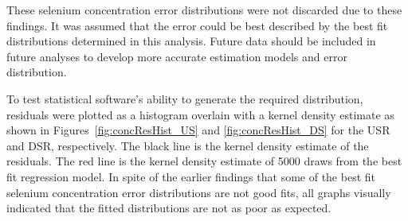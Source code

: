 These selenium concentration error distributions were not discarded due to these findings.  It was assumed that the error could be best described by the best fit distributions determined in this analysis.  Future data should be included in future analyses to develop more accurate estimation models and error distribution.

To test statistical software's ability to generate the required distribution, residuals were plotted as a histogram overlain with a kernel density estimate as shown in Figures~\ref{fig:concResHist_US} and \ref{fig:concResHist_DS} for the USR and DSR, respectively.  The black line is the kernel density estimate of the residuals.  The red line is the kernel density estimate of 5000 draws from the best fit regression model.  In spite of the earlier findings that some of the best fit selenium concentration error distributions are not good fits, all graphs visually indicated that the fitted distributions are not as poor as expected.

